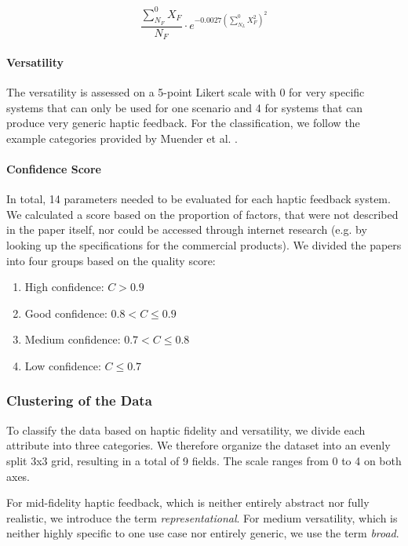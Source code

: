 \begin{equation}
    \frac{\sum_{N_F}^{0} X_F}{N_F} \cdot e^{-0.0027 \left(\sum_{N_L}^{0} X_F^2 \right)^2}
    \label{eq:fidelity_score}
\end{equation}


\paragraph{Versatility}
The versatility is assessed on a 5-point Likert scale with 0 for very specific systems that can only be used for one scenario and 4 for systems that can produce very generic haptic feedback. For the classification, we follow the example categories provided by Muender et al. \cite{Muender2022HapticReality}.


\paragraph{Confidence Score}
\label{sec:confidence}
In total, 14 parameters needed to be evaluated for each haptic feedback system. We calculated a score based on the proportion of factors, that were not described in the paper itself, nor could be accessed through internet research (e.g. by looking up the specifications for the commercial products).
We divided the papers into four groups based on the quality score:

\begin{enumerate}
	\item High confidence: $C > 0.9$
	\item Good confidence: $0.8 < C \leq 0.9$
	\item Medium confidence: $0.7 < C \leq 0.8$
	\item Low confidence: $C \leq 0.7$
\end{enumerate} 


\subsubsection{Clustering of the Data}
To classify the data based on haptic fidelity and versatility, we divide each attribute into three categories. We therefore organize the dataset into an evenly split 3x3 grid, resulting in a total of 9 fields. The scale ranges from 0 to 4 on both axes.

For mid-fidelity haptic feedback, which is neither entirely abstract nor fully realistic, we introduce the term \textit{representational}. For medium versatility, which is neither highly specific to one use case nor entirely generic, we use the term \textit{broad}.

